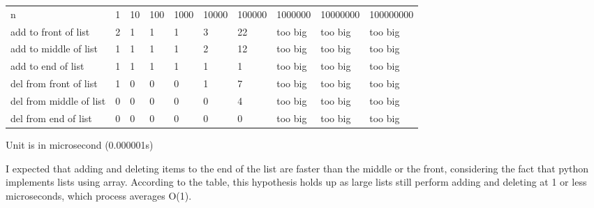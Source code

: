 \documentclass{article}
\begin{document}
\begin{itemize}
    \pagebreak
    \begin{table}[]
        \begin{tabular}{llllllllll}
            n                       & 1 & 10 & 100 & 1000 & 10000 & 100000 & 1000000 & 10000000 & 100000000 \\
            add to front of list    & 2 & 1  & 1   & 1    & 3     & 22     & too big & too big  & too big   \\
            add to middle of list   & 1 & 1  & 1   & 1    & 2     & 12     & too big & too big  & too big   \\
            add to end of list      & 1 & 1  & 1   & 1    & 1     & 1      & too big & too big  & too big   \\
            del from front of list  & 1 & 0  & 0   & 0    & 1     & 7      & too big & too big  & too big   \\
            del from middle of list & 0 & 0  & 0   & 0    & 0     & 4      & too big & too big  & too big   \\
            del from end of list    & 0 & 0  & 0   & 0    & 0     & 0      & too big & too big  & too big  
        \end{tabular}
    \end{table}

    Unit is in microsecond (0.000001s)

    I expected that adding and deleting items to the end of the list are faster than the middle or the front, considering the fact that python implements lists using array. According to the table, this hypothesis holds up as large lists still perform adding and deleting at 1 or less microseconds, which process averages O(1).
\end{itemize}
\end{document}
